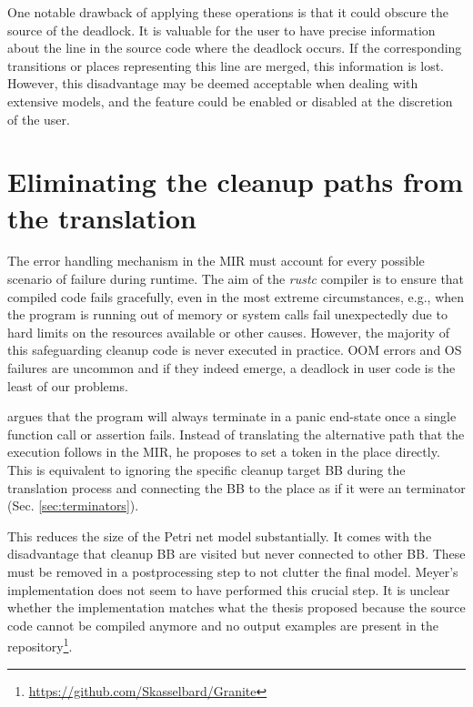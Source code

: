 One notable drawback of applying these operations is
that it could obscure the source of the deadlock.
It is valuable for the user to have precise information
about the line in the source code where the deadlock occurs.
If the corresponding transitions or places representing this line are merged,
this information is lost.
However, this disadvantage may be deemed acceptable when dealing with extensive models,
and the feature could be enabled or disabled at the discretion of the user.

\section{Eliminating the cleanup paths from the translation}
\label{sec:future-work-no-cleanup}

The error handling mechanism in the \acrshort{MIR}
must account for every possible scenario of failure during runtime.
The aim of the \emph{rustc} compiler is to ensure
that compiled code fails gracefully,
even in the most extreme circumstances,
e.g., when the program is running out of memory or system calls fail unexpectedly
due to hard limits on the resources available or other causes.
However, the majority of this safeguarding cleanup code is never executed in practice.
\acrshort{OOM} errors and \acrshort{OS} failures are uncommon
and if they indeed emerge, a deadlock in user code is the least of our problems.

\cite{meyer2020} argues that
the program will always terminate in a panic end-state
once a single function call or assertion fails.
Instead of translating the alternative path that the execution follows in the MIR,
he proposes to set a token in the place  directly.
This is equivalent to ignoring the specific cleanup target \acrshort{BB}
during the translation process
and connecting the \acrshort{BB} to the  place
as if it were an  terminator (Sec. \ref{sec:terminators}).

This reduces the size of the Petri net model substantially.
It comes with the disadvantage that cleanup \acrshort{BB} are visited but never connected
to other \acrshort{BB}.
These must be removed in a postprocessing step to not clutter the final model.
Meyer's implementation does not seem to have performed this crucial step.
It is unclear whether the implementation matches what the thesis proposed because
the source code cannot be compiled anymore and no output examples are present in the
repository\footnote{\url{https://github.com/Skasselbard/Granite}}.

